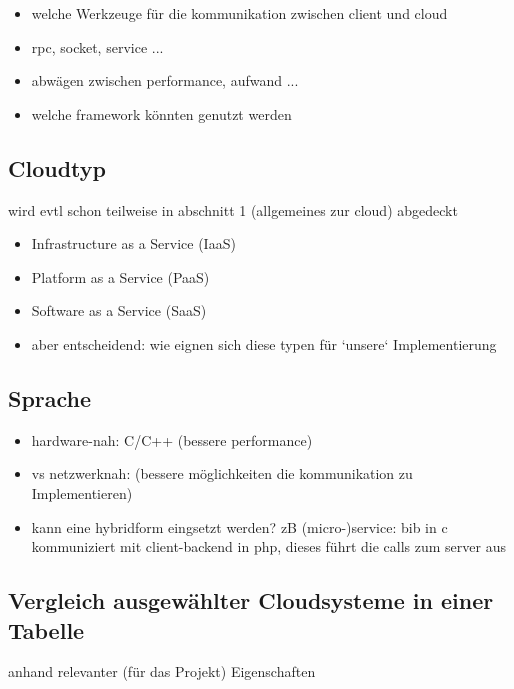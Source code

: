 \documentclass[a4paper,10pt]{article}
\begin{document}

\begin{itemize}
 \item welche Werkzeuge für die kommunikation zwischen client und cloud
 \item rpc, socket, service ...
 \item abwägen zwischen performance, aufwand ...
 \item welche framework könnten genutzt werden
\end{itemize}

\subsection{Cloudtyp}

wird evtl schon teilweise in abschnitt 1 (allgemeines zur cloud) abgedeckt

\begin{itemize}
 \item Infrastructure as a Service (IaaS)
 \item Platform as a Service (PaaS)
 \item Software as a Service (SaaS)
 \item aber entscheidend: wie eignen sich diese typen für `unsere` Implementierung
\end{itemize}

\subsection{Sprache}

\begin{itemize}
 \item hardware-nah: C/C++ (bessere performance)
 \item vs netzwerknah: (bessere möglichkeiten die kommunikation zu Implementieren)
 \item kann eine hybridform eingsetzt werden? 
 zB (micro-)service: bib in c kommuniziert mit client-backend in php, dieses führt die calls zum server aus
\end{itemize}

\subsection{Vergleich ausgewählter Cloudsysteme in einer Tabelle}

anhand relevanter (für das Projekt) Eigenschaften
\end{document}

